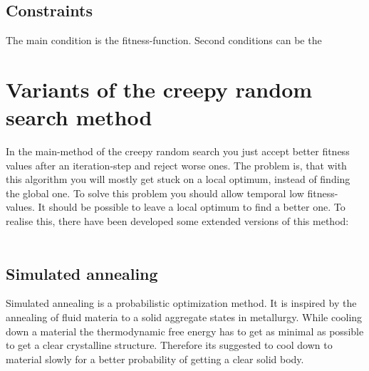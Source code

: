 \documentclass[10pt,a4paper,DIV=11]{scrreprt}
\begin{document}
\subsection{Constraints} %
The main condition is the fitness-function. Second conditions
can be the


\section{Variants of the creepy random search method}
In the main-method of the creepy random search you just accept better fitness values after an iteration-step and reject worse ones.
The problem is, that with this algorithm you will mostly get stuck on a local optimum, instead of finding the global one.
To solve this problem you should allow temporal low fitness-values. It should be possible to leave a local optimum to find a better one.
To realise this, there have been developed some extended versions of this method: \\

 \\


\subsection{Simulated annealing}
Simulated annealing is a probabilistic optimization method.
It is inspired by the annealing of fluid materia to a solid aggregate states in metallurgy. While cooling down a material the thermodynamic free energy has to get as minimal as possible to get a clear crystalline structure. Therefore its suggested to cool down to material slowly for a better probability of getting a clear solid body.
\end{document}

